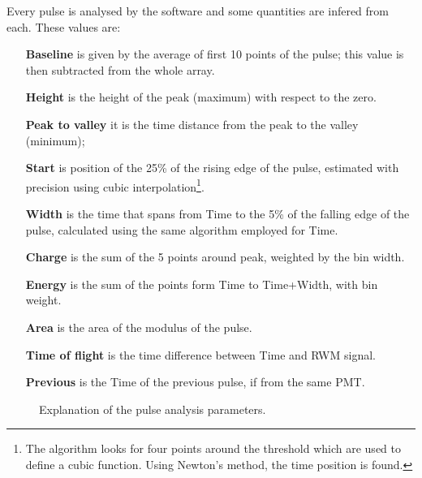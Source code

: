 Every pulse is analysed by the software and some quantities are infered from each.
These values are:

\begin{itemize}
  \item[\bfseries Baseline] is given by the average of first 10 points of the pulse; %
    this value is then subtracted from the whole array.
  \item[\bfseries Height] is the height of the peak (maximum) with respect to the zero.
  \item[\bfseries Peak to valley] it is the time distance from the peak to the valley (minimum);
  \item[\bfseries Start] is position of the 25\% of the rising edge of the pulse, estimated with %
    precision using cubic interpolation\footnote{The algorithm looks for four points around the %
    threshold which are used to define a cubic function. Using Newton's method, the time position %
    is found.}.
  \item[\bfseries Width] is the time that spans from Time to the 5\% of the falling edge %
    of the pulse, calculated using the same algorithm employed for Time.
  \item[\bfseries Charge] is the sum of the 5 points around peak, weighted by the bin width.
  \item[\bfseries Energy] is the sum of the points form Time to Time+Width, with bin weight.
  \item[\bfseries Area] is the area of the modulus of the pulse.
  \item[\bfseries Time of flight] is the time difference between Time and RWM signal.
  \item[\bfseries Previous] is the Time of the previous pulse, if from the same PMT.
\end{itemize}

\begin{figure}
  \centering
  \def\svgwidth{0.45\textwidth}
   \qquad
  \def\svgwidth{0.45\textwidth}
  \caption{Explanation of the pulse analysis parameters.}
\end{figure}

